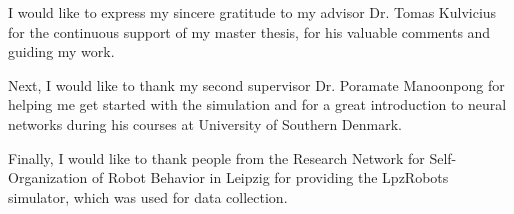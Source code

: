 
\begin{acknowledgements}

I would like to express my sincere gratitude to my advisor Dr. Tomas Kulvicius for the continuous support of my master thesis, for his valuable comments and guiding my work.

Next, I would like to thank my second supervisor Dr. Poramate Manoonpong for helping me get started with the simulation and for a great introduction to neural networks during his courses at University of Southern Denmark.

Finally, I would like to thank people from the Research Network for Self-Organization of Robot Behavior in Leipzig for providing the LpzRobots simulator, which was used for data collection.

\end{acknowledgements}